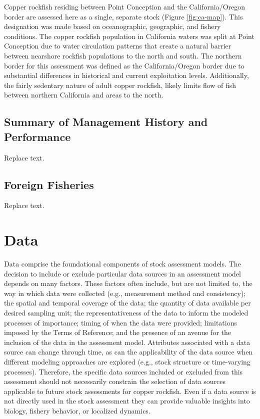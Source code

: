 \documentclass[11pt,
  english,
  letterpaper,
]{article}
\begin{document}
Copper rockfish residing between Point Conception and the California/Oregon border are assessed here as a single, separate stock (Figure \ref{fig:ca-map}). This designation was made based on oceanographic, geographic, and fishery conditions. The copper rockfish population in California waters was split at Point Conception due to water circulation patterns that create a natural barrier between nearshore rockfish populations to the north and south. The northern border for this assessment was defined as the California/Oregon border due to substantial differences in historical and current exploitation levels. Additionally, the fairly sedentary nature of adult copper rockfish, likely limits flow of fish between northern California and areas to the north.

\hypertarget{summary-of-management-history-and-performance}{%
\subsection{Summary of Management History and Performance}\label{summary-of-management-history-and-performance}}

Replace text.

\hypertarget{foreign-fisheries}{%
\subsection{Foreign Fisheries}\label{foreign-fisheries}}

Replace text.

\hypertarget{data}{%
\section{Data}\label{data}}

Data comprise the foundational components of stock assessment models. The decision to include or exclude particular data sources in an assessment model depends on many factors. These factors often include, but are not limited to, the way in which data were collected (e.g., measurement method and consistency); the spatial and temporal coverage of the data; the quantity of data available per desired sampling unit; the representativeness of the data to inform the modeled processes of importance; timing of when the data were provided; limitations imposed by the Terms of Reference; and the presence of an avenue for the inclusion of the data in the assessment model. Attributes associated with a data source can change through time, as can the applicability of the data source when different modeling approaches are explored (e.g., stock structure or time-varying processes). Therefore, the specific data sources included or excluded from this assessment should not necessarily constrain the selection of data sources applicable to future stock assessments for copper rockfish. Even if a data source is not directly used in the stock assessment they can provide valuable insights into biology, fishery behavior, or localized dynamics.
\end{document}
